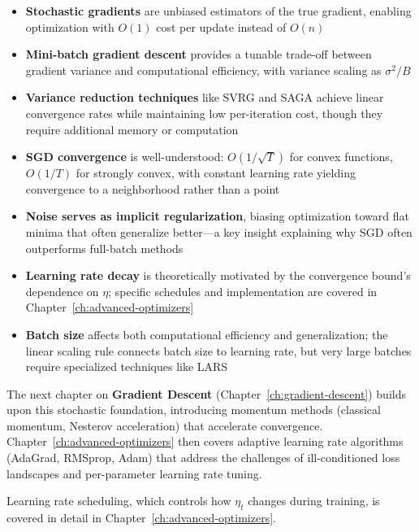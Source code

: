 \documentclass[../../main.tex]{subfiles}
\begin{document}
\begin{itemize}
    \item \textbf{Stochastic gradients} are unbiased estimators of the true gradient, enabling optimization with $O(1)$ cost per update instead of $O(n)$

    \item \textbf{Mini-batch gradient descent} provides a tunable trade-off between gradient variance and computational efficiency, with variance scaling as $\sigma^2/B$

    \item \textbf{Variance reduction techniques} like SVRG and SAGA achieve linear convergence rates while maintaining low per-iteration cost, though they require additional memory or computation

    \item \textbf{SGD convergence} is well-understood: $O(1/\sqrt{T})$ for convex functions, $O(1/T)$ for strongly convex, with constant learning rate yielding convergence to a neighborhood rather than a point

    \item \textbf{Noise serves as implicit regularization}, biasing optimization toward flat minima that often generalize better---a key insight explaining why SGD often outperforms full-batch methods

    \item \textbf{Learning rate decay} is theoretically motivated by the convergence bound's dependence on $\eta$; specific schedules and implementation are covered in Chapter~\ref{ch:advanced-optimizers}

    \item \textbf{Batch size} affects both computational efficiency and generalization; the linear scaling rule connects batch size to learning rate, but very large batches require specialized techniques like LARS
\end{itemize}

The next chapter on \textbf{Gradient Descent} (Chapter~\ref{ch:gradient-descent}) builds upon this stochastic foundation, introducing momentum methods (classical momentum, Nesterov acceleration) that accelerate convergence. Chapter~\ref{ch:advanced-optimizers} then covers adaptive learning rate algorithms (AdaGrad, RMSprop, Adam) that address the challenges of ill-conditioned loss landscapes and per-parameter learning rate tuning.

Learning rate scheduling, which controls how $\eta_t$ changes during training, is covered in detail in Chapter~\ref{ch:advanced-optimizers}.
\end{document}
